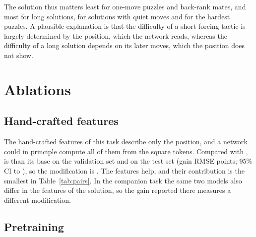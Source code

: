 \documentclass[11pt]{article}
\begin{document}
The solution thus matters least for one-move puzzles and back-rank mates,
and most for long solutions, for solutions with quiet moves and for the
hardest puzzles. A plausible explanation is that the difficulty of a short
forcing tactic is largely determined by the position, which the network
reads, whereas the difficulty of a long solution depends on its later moves,
which the position does not show.
\fi
\fi

\ifchanges
\section{Ablations}
\label{sec:ablations}



\ifchangehand
\subsection{Hand-crafted features}

The hand-crafted features of this task describe only the position, and a
network could in principle compute all of them from the square tokens.
Compared with ,  is
 than its
base on the validation set and
 on the test set
(gain  RMSE points;
95\% CI  to
), so the
modification is . The
features help, and their contribution is the smallest in
Table~\ref{tab:pairs}.
\ifshown
In the companion task the same two models also differ in the features of the
solution, so the gain reported there measures a different modification.
\fi
\fi

\ifchangestart
\subsection{Pretraining}
\end{document}
